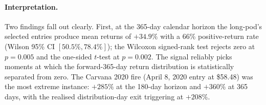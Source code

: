 \documentclass[11pt,a4paper]{article}
\begin{document}
\begin{table}[h]
\centering\small
{}
\caption{Long-pod six-condition recovery-test forward returns. n = 43 fires across 14 of 17 in-sample firms over 2020--2026 (sample drops to 41 at 180/365d due to right-censored observations). Wilcoxon and $t$-test $p$-values are one-sided against the null of zero return. Mann-Whitney $p$-values are one-sided against a same-firm naive-momentum baseline (200 random trading-day entries per firm where trailing-90-day return $> 0$). Bootstrap 95\% CI on the 365d mean return: $[+15.2\%, +59.0\%]$. Source: \texttt{empirics\_v2/out/v2/long\_pod\_v3\_summary.csv}.}\label{tab:longpod_v3}
\end{table}

\paragraph{Interpretation.} Two findings fall out clearly. First, at the 365-day calendar horizon the long-pod's selected entries produce mean returns of $+34.9\%$ with a 66\% positive-return rate (Wilson 95\% CI $[50.5\%, 78.4\%]$); the Wilcoxon signed-rank test rejects zero at $p = 0.005$ and the one-sided $t$-test at $p = 0.002$. The signal reliably picks moments at which the forward-365-day return distribution is statistically separated from zero. The Carvana 2020 fire (April 8, 2020 entry at \$58.48) was the most extreme instance: $+285\%$ at the 180-day horizon and $+360\%$ at 365 days, with the realised distribution-day exit triggering at $+208\%$.
\end{document}
